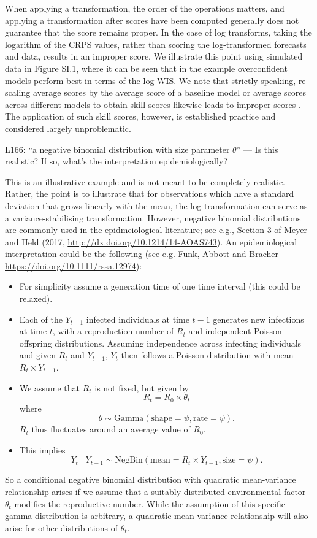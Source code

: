 \documentclass{article}
\newcommand{\black}{\color{black}}
\newcommand{\blue}{\color{blue}}
\newcommand{\notindented}{\setlength{\leftskip}{0cm}}
\begin{document}
When applying a transformation, the order of the operations matters, and applying a transformation after scores have been computed generally does not guarantee that the score remains proper. In the case of log transforms, taking the logarithm of the CRPS values, rather than scoring the log-transformed forecasts and data, results in an improper score. We illustrate this point using simulated data in Figure SI.1, where it can be seen that in the example overconfident models perform best in terms of the log WIS. We note that strictly speaking, re-scaling average scores by the average score of a baseline model or average scores across different models  to obtain skill scores likewise leads to improper scores \citep{gneitingStrictlyProperScoring2007}. The application of such skill scores, however, is established practice and considered largely unproblematic.

\notindented



\blue
L166: “a negative binomial distribution with size parameter $\theta$” — Is this realistic? If so, what’s the interpretation epidemiologically?

\black
This is an illustrative example and is not meant to be completely realistic. Rather, the point is to illustrate that for observations which have a standard deviation that grows linearly with the mean, the log transformation can serve as a variance-stabilising transformation. However, negative binomial distributions are commonly used in the epidmeiological literature; see e.g., Section 3 of Meyer and Held (2017, \url{http://dx.doi.org/10.1214/14-AOAS743}). An epidemiological interpretation could be the following (see e.g. Funk, Abbott and Bracher \url{https://doi.org/10.1111/rssa.12974}):
\begin{itemize}
    \item For simplicity assume a generation time of one time interval (this could be relaxed).
    \item Each of the $Y_{t - 1}$ infected individuals at time $t - 1$  generates new infections at time $t$, with a reproduction number of $R_t$ and independent Poisson offspring distributions. Assuming independence across infecting individuals and given $R_t$ and $Y_{t - 1}$, $Y_t$ then follows a Poisson distribution with mean $R_t \times Y_{t - 1}$.
    \item We assume that $R_t$ is not fixed, but given by
    $$
    R_t = R_0 \times \theta_t
    $$
    where
    $$
    \theta \sim \text{Gamma}(\text{shape} = \psi, \text{rate} = \psi).
    $$
    $R_t$ thus fluctuates around an average value of $R_0$.
    \item This implies
    $$
    Y_t \mid Y_{t - 1} \sim \text{NegBin}(\text{mean} = R_t \times Y_{t - 1}, \text{size} = \psi).
    $$
\end{itemize}
So a conditional negative binomial distribution with quadratic mean-variance relationship arises if we assume that a suitably distributed environmental factor $\theta_t$ modifies the reproductive number. While the assumption of this specific gamma distribution is arbitrary, a quadratic mean-variance relationship will also arise for other distributions of $\theta_t$.
\end{document}
